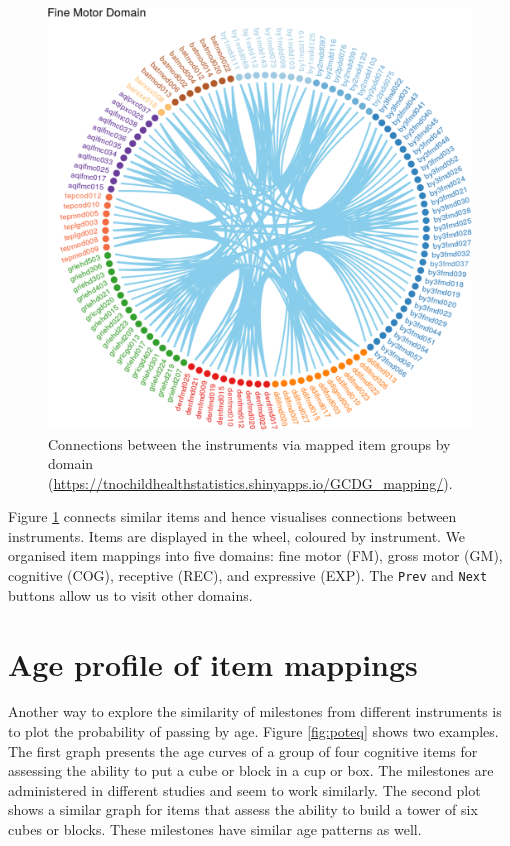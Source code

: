 \documentclass[
]{book}
\begin{document}
\begin{figure}

{\centering \includegraphics[width=1\linewidth]{fig/ring} 

}

\caption{Connections between the instruments via mapped item groups by domain (\url{https://tnochildhealthstatistics.shinyapps.io/GCDG_mapping/}).}\label{fig:mappingshiny}
\end{figure}



Figure \ref{fig:mappingshiny} connects similar items and hence visualises connections between instruments. Items are displayed in the wheel, coloured by instrument. We organised item mappings into five domains: fine motor (FM), gross motor (GM), cognitive (COG), receptive (REC), and expressive (EXP). The \texttt{Prev} and \texttt{Next} buttons allow us to visit other domains.

\hypertarget{sec:viewmapping}{%
\section{Age profile of item mappings}\label{sec:viewmapping}}

Another way to explore the similarity of milestones from different instruments is to plot the probability of passing by age. Figure \ref{fig:poteq} shows two examples. The first graph presents the age curves of a group of four cognitive items for assessing the ability to put a cube or block in a cup or box. The milestones are administered in different studies and seem to work similarly. The second plot shows a similar graph for items that assess the ability to build a tower of six cubes or blocks. These milestones have similar age patterns as well.
\end{document}
